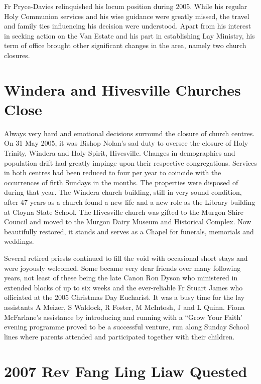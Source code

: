 Fr Pryce-Davies relinquished his locum position during 2005. While his regular Holy Communion services and his wise guidance were greatly missed, the travel and family ties influencing his decision were understood. Apart from his interest in seeking action on the Van Estate and his part in establishing Lay Ministry, his term of office brought other significant changes in the area, namely two church closures.



\section{Windera and Hivesville Churches Close}



Always very hard and emotional decisions surround the closure of church centres. On 31 May 2005, it was Bishop Nolan's sad duty to oversee the closure of Holy Trinity, Windera and Holy Spirit, Hivesville. Changes in demographics and population drift had greatly impinge upon their respective congregations. Services in both centres had been reduced to four per year to coincide with the occurrences of firth Sundays in the months. The properties were disposed of during that year. The Windera church building, still in very sound condition, after 47 years as a church found a new life and a new role as the Library building at Cloyna State School. The Hivesville church was gifted to the Murgon Shire Council and moved to the Murgon Dairy Museum and Historical Complex. Now beautifully restored, it stands and serves as a Chapel for funerals, memorials and weddings.



Several retired priests continued to fill the void with occasional short stays and were joyously welcomed. Some became very dear friends over many following years, not least of these being the late Canon Ron Dyson who ministered in extended blocks of up to six weeks and the ever-reliable Fr Stuart James who officiated at the 2005 Christmas Day Eucharist. It was a busy time for the lay assistants A Meizer, S Waldock, R Foster, M McIntosh, J and L Quinn. Fiona McFarlane's assistance by introducing and running with a ``Grow Your Faith' evening programme proved to be a successful venture, run along Sunday School lines where parents attended and participated together with their children.



\section{2007 Rev Fang Ling Liaw Quested}



